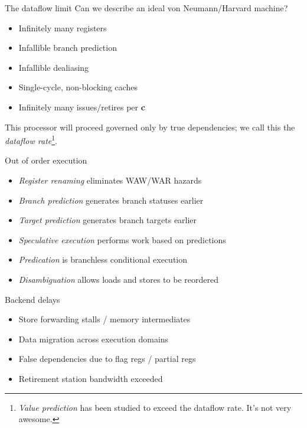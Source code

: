 \documentclass[mathserif,xcolor={dvipsnames,table}]{beamer}
\begin{document}
\begin{frame}{The dataflow limit}
Can we describe an ideal von Neumann/Harvard machine?
\begin{itemize}
\item Infinitely many registers
\item Infallible branch prediction
\item Infallible dealiasing
\item Single-cycle, non-blocking caches
\item Infinitely many issues/retires per \textbf{c}
\end{itemize}
\vfill
This processor will proceed governed only by true dependencies; we
call this the \textit{dataflow rate}\footnote{\tiny{\textit{Value prediction}
has been studied to exceed the dataflow rate. It's not very awesome.}}.
\end{frame}

\begin{frame}{Out of order execution}
\begin{itemize}
\item \textit{Register renaming} eliminates WAW/WAR hazards
\item \textit{Branch prediction} generates branch statuses earlier
\item \textit{Target prediction} generates branch targets earlier
\item \textit{Speculative execution} performs work based on predictions
\item \textit{Predication} is branchless conditional execution
\item \textit{Disambiguation} allows loads and stores to be reordered
\end{itemize}
\end{frame}

\begin{frame}{Backend delays}
\begin{itemize}
\item Store forwarding stalls / memory intermediates
\item Data migration across execution domains
\item False dependencies due to flag regs / partial regs
\item Retirement station bandwidth exceeded
\end{itemize}
\end{frame}
\end{document}
